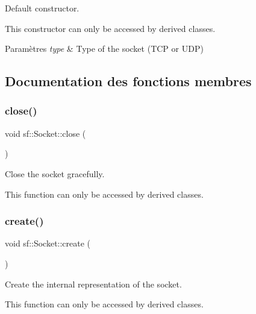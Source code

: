 Default constructor. 

This constructor can only be accessed by derived classes.


\begin{DoxyParams}{Paramètres}
{\em type} & Type of the socket (T\+CP or U\+DP) \\
\hline
\end{DoxyParams}


\subsection{Documentation des fonctions membres}
\mbox{\label{classsf_1_1Socket_a71f2f5c2aa99e01cafe824fee4c573be}} 
\subsubsection{\texorpdfstring{close()}{close()}}
{\footnotesize\ttfamily void sf\+::\+Socket\+::close (\begin{DoxyParamCaption}{ }\end{DoxyParamCaption})\hspace{0.3cm}{\ttfamily [protected]}}



Close the socket gracefully. 

This function can only be accessed by derived classes. \mbox{\label{classsf_1_1Socket_aafbe140f4b1921e0d19e88cf7a61dcbc}} 
\subsubsection{\texorpdfstring{create()}{create()}\hspace{0.1cm}{\footnotesize\ttfamily [1/2]}}
{\footnotesize\ttfamily void sf\+::\+Socket\+::create (\begin{DoxyParamCaption}{ }\end{DoxyParamCaption})\hspace{0.3cm}{\ttfamily [protected]}}



Create the internal representation of the socket. 

This function can only be accessed by derived classes. \mbox{\label{classsf_1_1Socket_af1dd898f7aa3ead7ff7b2d1c20e97781}} 
